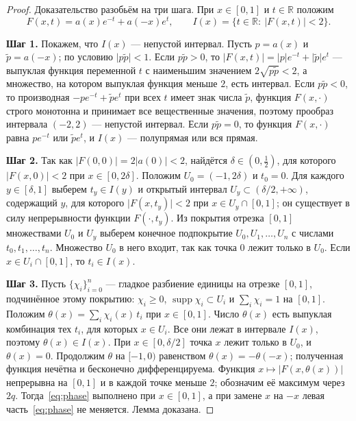 \documentclass[12pt,a4paper]{article}
\theoremstyle{definition}
\newcommand{\step}[1]{\smallskip\noindent\textbf{Шаг #1.}}
\newcommand{\R}{\mathbb R}
\newcommand{\abs}[1]{\lvert#1\rvert}
\begin{document}
\begin{proof}
Доказательство разобьём на три шага. При $x\in[0,1]$ и $t\in\R$ положим
\[
 F(x,t)=a(x)e^{-t}+a(-x)e^{t},\qquad I(x)=\{t\in\R:\ \abs{F(x,t)}<2\}.
\]

\step{1} Покажем, что $I(x)$ --- непустой интервал. Пусть $p=a(x)$ и $\tilde p=a(-x)$;
по условию $\abs{p\tilde p}<1$. Если $p\tilde p>0$, то
$\abs{F(x,t)}=\abs pe^{-t}+\abs{\tilde p}e^{t}$ --- выпуклая функция переменной $t$ с
наименьшим значением $2\sqrt{p\tilde p}<2$, а множество, на котором выпуклая функция
меньше $2$, есть интервал. Если $p\tilde p<0$, то производная $-pe^{-t}+\tilde pe^{t}$
при всех $t$ имеет знак числа $\tilde p$, функция $F(x,\cdot)$ строго монотонна и
принимает все вещественные значения, поэтому прообраз интервала $(-2,2)$ --- непустой
интервал. Если $p\tilde p=0$, то функция $F(x,\cdot)$ равна $pe^{-t}$ или
$\tilde pe^{t}$, и $I(x)$ --- полупрямая или вся прямая.

\step{2} Так как $\abs{F(0,0)}=2\abs{a(0)}<2$, найдётся $\delta\in(0,\tfrac12)$, для
которого $\abs{F(x,0)}<2$ при $x\in[0,2\delta]$. Положим $U_0=(-1,2\delta)$ и $t_0=0$.
Для каждого $y\in[\delta,1]$ выберем $t_y\in I(y)$ и открытый интервал
$U_y\subset(\delta/2,+\infty)$, содержащий $y$, для которого $\abs{F(x,t_y)}<2$ при
$x\in U_y\cap[0,1]$; он существует в силу непрерывности функции $F(\cdot,t_y)$. Из
покрытия отрезка $[0,1]$ множествами $U_0$ и $U_y$ выберем конечное подпокрытие
$U_0,U_1,\dots,U_n$ с числами $t_0,t_1,\dots,t_n$. Множество $U_0$ в него входит, так как
точка $0$ лежит только в $U_0$. Если $x\in U_i\cap[0,1]$, то $t_i\in I(x)$.

\step{3} Пусть $\{\chi_i\}_{i=0}^n$ --- гладкое разбиение единицы на отрезке $[0,1]$,
подчинённое этому покрытию: $\chi_i\ge0$, $\operatorname{supp}\chi_i\subset U_i$ и
$\sum_i\chi_i=1$ на $[0,1]$. Положим $\theta(x)=\sum_i\chi_i(x)\,t_i$ при $x\in[0,1]$.
Число $\theta(x)$ есть выпуклая комбинация тех $t_i$, для которых $x\in U_i$. Все они
лежат в интервале $I(x)$, поэтому $\theta(x)\in I(x)$. При $x\in[0,\delta/2]$ точка $x$
лежит только в $U_0$, и $\theta(x)=0$. Продолжим $\theta$ на $[-1,0)$ равенством
$\theta(x)=-\theta(-x)$; полученная функция нечётна и бесконечно дифференцируема. Функция
$x\mapsto\abs{F(x,\theta(x))}$ непрерывна на $[0,1]$ и в каждой точке меньше $2$;
обозначим её максимум через $2q$. Тогда~\eqref{eq:phase} выполнено при $x\in[0,1]$, а при
замене $x$ на $-x$ левая часть~\eqref{eq:phase} не меняется. Лемма доказана.
\end{proof}
\end{document}
